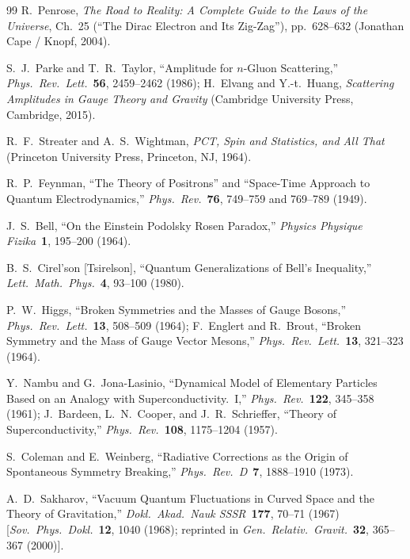 \documentclass[11pt,a4paper]{article}
\begin{document}
\begin{thebibliography}{99}
R.~Penrose, \emph{The Road to Reality: A Complete Guide to the Laws of the Universe}, Ch.\ 25 (``The Dirac Electron and Its Zig-Zag''), pp.\ 628--632 (Jonathan Cape / Knopf, 2004).

S.~J.~Parke and T.~R.~Taylor, ``Amplitude for $n$-Gluon Scattering,'' \emph{Phys.\ Rev.\ Lett.}\ \textbf{56}, 2459--2462 (1986); H.~Elvang and Y.-t.~Huang, \emph{Scattering Amplitudes in Gauge Theory and Gravity} (Cambridge University Press, Cambridge, 2015).

R.~F.~Streater and A.~S.~Wightman, \emph{PCT, Spin and Statistics, and All That} (Princeton University Press, Princeton, NJ, 1964).

R.~P.~Feynman, ``The Theory of Positrons'' and ``Space-Time Approach to Quantum Electrodynamics,'' \emph{Phys.\ Rev.}\ \textbf{76}, 749--759 and 769--789 (1949).

J.~S.~Bell, ``On the Einstein Podolsky Rosen Paradox,'' \emph{Physics Physique Fizika}\ \textbf{1}, 195--200 (1964).

B.~S.~Cirel'son [Tsirelson], ``Quantum Generalizations of Bell's Inequality,'' \emph{Lett.\ Math.\ Phys.}\ \textbf{4}, 93--100 (1980).

P.~W.~Higgs, ``Broken Symmetries and the Masses of Gauge Bosons,'' \emph{Phys.\ Rev.\ Lett.}\ \textbf{13}, 508--509 (1964); F.~Englert and R.~Brout, ``Broken Symmetry and the Mass of Gauge Vector Mesons,'' \emph{Phys.\ Rev.\ Lett.}\ \textbf{13}, 321--323 (1964).

Y.~Nambu and G.~Jona-Lasinio, ``Dynamical Model of Elementary Particles Based on an Analogy with Superconductivity.\ I,'' \emph{Phys.\ Rev.}\ \textbf{122}, 345--358 (1961); J.~Bardeen, L.~N.~Cooper, and J.~R.~Schrieffer, ``Theory of Superconductivity,'' \emph{Phys.\ Rev.}\ \textbf{108}, 1175--1204 (1957).

S.~Coleman and E.~Weinberg, ``Radiative Corrections as the Origin of Spontaneous Symmetry Breaking,'' \emph{Phys.\ Rev.\ D}\ \textbf{7}, 1888--1910 (1973).

A.~D.~Sakharov, ``Vacuum Quantum Fluctuations in Curved Space and the Theory of Gravitation,'' \emph{Dokl.\ Akad.\ Nauk SSSR}\ \textbf{177}, 70--71 (1967) [\emph{Sov.\ Phys.\ Dokl.}\ \textbf{12}, 1040 (1968); reprinted in \emph{Gen.\ Relativ.\ Gravit.}\ \textbf{32}, 365--367 (2000)].


\end{thebibliography}
\end{document}
